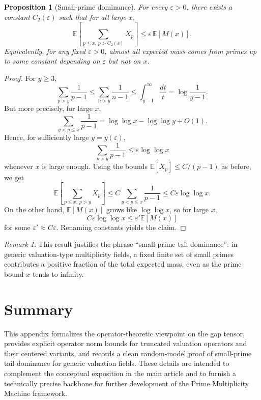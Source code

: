 \documentclass[11pt]{article}
\theoremstyle{definition}
\theoremstyle{plain}
\newtheorem{proposition}[definition]{Proposition}
\theoremstyle{remark}
\newtheorem{remark}[definition]{Remark}
\newcommand{\EE}{\mathbb{E}}
\newcommand{\1}{\mathbb{1}}
\begin{document}
\begin{proposition}[Small-prime dominance]
For every \(\varepsilon > 0\), there exists a constant \(C_2(\varepsilon)\) such that for all large \(x\),
\[
  \EE\left[\sum_{p\le x,\,p> C_2(\varepsilon)} X_p\right]
  \le \varepsilon \,\EE[M(x)].
\]
Equivalently, for any fixed \(\varepsilon>0\), almost all expected mass comes from primes up to some constant depending on \(\varepsilon\) but not on \(x\).
\end{proposition}

\begin{proof}
For \(y \ge 3\),
\[
  \sum_{p>y} \frac{1}{p-1}
  \le \sum_{n>y} \frac{1}{n-1}
  \le \int_{y-1}^\infty \frac{dt}{t}
  = \log\frac{1}{y-1}.
\]
But more precisely, for large \(x\),
\[
  \sum_{y < p\le x} \frac{1}{p-1} = \log\log x - \log\log y + O(1).
\]
Hence, for sufficiently large \(y=y(\varepsilon)\),
\[
  \sum_{p>y} \frac{1}{p-1} \le \varepsilon \log\log x
\]
whenever \(x\) is large enough. Using the bounds \(\EE[X_p]\le C/(p-1)\) as before, we get
\[
  \EE\left[\sum_{p\le x,\,p>y} X_p\right]
  \le C \sum_{y < p\le x} \frac{1}{p-1}
  \le C\varepsilon \log\log x.
\]
On the other hand, \(\EE[M(x)]\) grows like \(\log\log x\), so for large \(x\),
\[
  C\varepsilon \log\log x \le \varepsilon' \EE[M(x)]
\]
for some \(\varepsilon' \approx C\varepsilon\). Renaming constants yields the claim.
\end{proof}

\begin{remark}
This result justifies the phrase ``small-prime tail dominance'': in generic valuation-type multiplicity fields, a fixed finite set of small primes contributes a positive fraction of the total expected mass, even as the prime bound \(x\) tends to infinity.
\end{remark}

\section{Summary}

This appendix formalizes the operator-theoretic viewpoint on the gap tensor, provides explicit operator norm bounds for truncated valuation operators and their centered variants, and records a clean random-model proof of small-prime tail dominance for generic valuation fields. These details are intended to complement the conceptual exposition in the main article and to furnish a technically precise backbone for further development of the Prime Multiplicity Machine framework.


\nocite{*}
  

\end{document}
